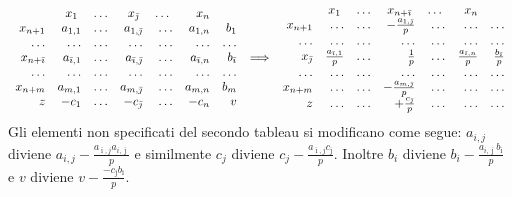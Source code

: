 \documentclass[10pt]{article}
\begin{document}
\[
   \begin{array}{rrrrrrr}
         & x_1 \; & \ldots  & x_{\bar{\jmath}} \; & \ldots  \; & x_n\\
      x_{n+1} & a_{1,1} & \ldots & a_{1,\bar{\jmath}} & \ldots & a_{1,n} &  b_1 \\
      \ldots  & \ldots  & \ldots & \ldots  & \ldots & \ldots  & \ldots \\
      x_{n+\bar{\imath}} & a_{\bar{\imath},1} & \ldots & a_{\bar{\imath},\bar{\jmath}} & \ldots & a_{\bar{\imath},n} &  b_{\bar{\imath}} \\
      \ldots  & \ldots  & \ldots & \ldots  & \ldots & \ldots  & \ldots \\
      x_{n+m} & a_{m,1} & \ldots & a_{m,\bar{\jmath}} & \ldots & a_{m,n} &  b_m \\
         z    & -c_1 & \ldots & -c_{\bar{\jmath}} & \ldots & -c_n &  v \\
   \end{array}
\hspace{0.2cm}
{\Huge \Longrightarrow}
\hspace{0.2cm}
   \begin{array}{rrrrrrr}
         & x_1 \; & \ldots  & x_{n+\bar{\imath}} \; & \ldots  \; & x_n\\
      x_{n+1} & \ldots & \ldots & -\frac{a_{1,\bar{\jmath}}}{p} & \ldots & \ldots &  \ldots \\
      \ldots  & \ldots  & \ldots & \ldots  & \ldots & \ldots  & \ldots \\
      x_{\bar{\jmath}} & \frac{a_{\bar{\imath},1}}{p} & \ldots & \frac{1}{p} & \ldots & \frac{a_{\bar{\imath},n}}{p} &  \frac{b_{\bar{\imath}}}{p} \\
      \ldots  & \ldots  & \ldots & \ldots  & \ldots & \ldots  & \ldots \\
      x_{n+m} & \ldots & \ldots & -\frac{a_{m,\bar{\jmath}}}{p} & \ldots & \ldots & \ldots \\
         z    & \ldots & \ldots & +\frac{c_{\bar{\jmath}}}{p} & \ldots & \ldots &  \ldots \\
   \end{array}
\]
Gli elementi non specificati del secondo tableau
si modificano come segue:
$a_{i,j}$ diviene $a_{i,j}-\frac{a_{\bar{\imath},j}a_{i,\bar{\jmath}}}{p}$ e 
similmente $c_j$ diviene $c_j-\frac{a_{\bar{\imath},j}c_{\bar{\jmath}}}{p}$.
Inoltre $b_i$ diviene $b_i-\frac{a_{i,\bar{\jmath}}b_{\bar{\imath}}}{p}$
e $v$ diviene $v-\frac{-c_{\bar{\jmath}}b_{\bar{\imath}}}{p}$.\\ 
\end{document}
